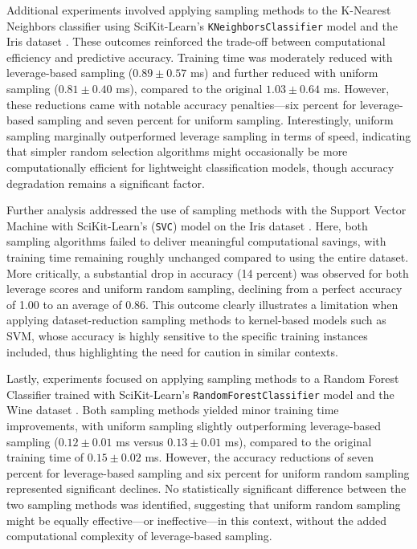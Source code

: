 \documentclass{article}
\theoremstyle{plain}
\theoremstyle{definition}
\theoremstyle{remark}
\begin{document}
Additional experiments involved applying sampling methods to the K-Nearest Neighbors classifier using SciKit-Learn's \texttt{KNeighborsClassifier} model and the Iris dataset \cite{iris}. These outcomes reinforced the trade-off between computational efficiency and predictive accuracy. Training time was moderately reduced with leverage-based sampling ($0.89 \pm 0.57$ ms) and further reduced with uniform sampling ($0.81 \pm 0.40$ ms), compared to the original $1.03 \pm 0.64$ ms. However, these reductions came with notable accuracy penalties—six percent for leverage-based sampling and seven percent for uniform sampling. Interestingly, uniform sampling marginally outperformed leverage sampling in terms of speed, indicating that simpler random selection algorithms might occasionally be more computationally efficient for lightweight classification models, though accuracy degradation remains a significant factor.

Further analysis addressed the use of sampling methods with the Support Vector Machine with SciKit-Learn's (\texttt{SVC}) model on the Iris dataset \cite{iris}. Here, both sampling algorithms failed to deliver meaningful computational savings, with training time remaining roughly unchanged compared to using the entire dataset. More critically, a substantial drop in accuracy (14 percent) was observed for both leverage scores and uniform random sampling, declining from a perfect accuracy of 1.00 to an average of 0.86. This outcome clearly illustrates a limitation when applying dataset-reduction sampling methods to kernel-based models such as SVM, whose accuracy is highly sensitive to the specific training instances included, thus highlighting the need for caution in similar contexts.

Lastly, experiments focused on applying sampling methods to a Random Forest Classifier trained with SciKit-Learn's \texttt{RandomForestClassifier} model and the Wine dataset \cite{wine}. Both sampling methods yielded minor training time improvements, with uniform sampling slightly outperforming leverage-based sampling ($0.12 \pm 0.01$ ms versus $0.13 \pm 0.01$ ms), compared to the original training time of $0.15 \pm 0.02$ ms. However, the accuracy reductions of seven percent for leverage-based sampling and six percent for uniform random sampling represented significant declines. No statistically significant difference between the two sampling methods was identified, suggesting that uniform random sampling might be equally effective—or ineffective—in this context, without the added computational complexity of leverage-based sampling.
\end{document}
